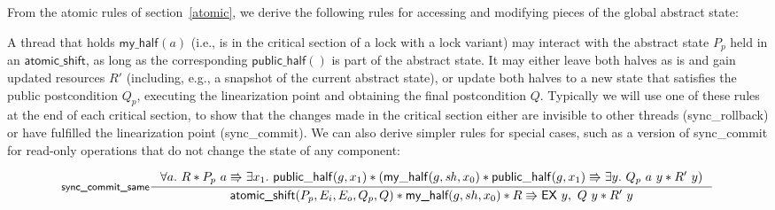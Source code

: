 \documentclass[acmsmall,screen]{acmart}\settopmatter{printfolios=true}
\newcommand{\myhalf}[2]{\ensuremath{\mathsf{my\_half}_{#1}(#2)}}
\newcommand{\publichalf}[1]{\ensuremath{\mathsf{public\_half}(#1)}}
\begin{document}
From the atomic rules of section~\ref{atomic}, we derive the following rules for accessing and modifying pieces of the global abstract state:
\begin{mathpar}

\end{mathpar}
A thread that holds $\myhalf{}{a}$ (i.e., is in the critical section of a lock with a lock variant) may interact with the abstract state $P_p$ held in an $\textsf{atomic\_shift}$, as long as the corresponding $\publichalf{}$ is part of the abstract state. It may either leave both halves as is and gain updated resources $R'$ (including, e.g., a snapshot of the current abstract state), or update both halves to a new state that satisfies the public postcondition $Q_p$, executing the linearization point and obtaining the final postcondition $Q$. Typically we will use one of these rules at the end of each critical section, to show that the changes made in the critical section either are invisible to other threads (\textsf{sync\_rollback}) or have fulfilled the linearization point (\textsf{sync\_commit}). We can also derive simpler rules for special cases, such as a version of \textsf{sync\_commit} for read-only operations that do not change the state of any component:

$$\inference[\textsf{sync\_commit\_same}]{\forall a.\ R * P_p\ a \Rrightarrow \exists x_1.\ \mathsf{public\_half}(g, x_1) * (\mathsf{my\_half}(g, \mathit{sh}, x_0) * \mathsf{public\_half}(g, x_1) \Rrightarrow \exists y.\ Q_p\ a\ y * R'\ y)}{\textsf{atomic\_shift}(P_p, E_i, E_o, Q_p, Q) * \textsf{my\_half}(g,sh,x_0) * R \Rrightarrow \mathsf{EX}\ y,\ Q\ y * R'\ y}$$
\end{document}
